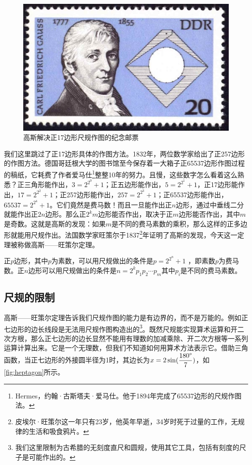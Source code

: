 \documentclass[b5paper]{ctexart}
\begin{document}
\begin{figure}[htbp]
 \centering
 \includegraphics[scale=0.5]{img/gauss-17gon}
 \caption{高斯解决正17边形尺规作图的纪念邮票}
 \label{fig:gauss-17gon}
\end{figure}

\label{sec:geometric-cons-polygon}
我们这里跳过了正17边形具体的作图方法。1832年，两位数学家给出了正257边形的作图方法。德国哥廷根大学的图书馆至今保存着一大箱子正65537边形作图过程的稿纸，它耗费了作者爱马仕\footnote{Hermes，约翰·古斯塔夫·爱马仕。他于1894年完成了65537边形的尺规作图法。}整整10年的努力。且慢，这些数字怎么看着这么熟悉？正三角形能作出，$3 = 2^{2^0} + 1$；正五边形能作出，$5 = 2^{2^1} + 1$，正17边形能作出，$17 = 2^{2^2} + 1$；正257边形能作出，$257 = 2^{2^3} + 1$；正65537边形能作出，$65537 = 2^{2^4} + 1$。它们竟然是费马数！而且一旦能作出正$n$边形，通过中垂线二分就能作出正$2n$边形。那么正$2^k m$边形能否作出，取决于正$m$边形能否作出，其中$m$是奇数。这就是高斯的发现：如果$m$是不同的费马素数的乘积，那么这样的正多边形就能用尺规作出。法国数学家旺策尔于1837\footnote{皮埃尔·旺策尔这一年只有23岁，他英年早逝，34岁时死于过量的工作，无规律的生活和吸食鸦片。}年证明了高斯的发现，今天这一定理被称做高斯——旺策尔定理。

\begin{theorem}[高斯——旺策尔]
正$p$边形，其中$p$为素数，可以用尺规做出的条件是$p=2^{2^n} + 1$ ，即素数$p$为费马数。正$n$边形可以用尺规做出的条件是$n=2^k p_1 p_2 \dotsm p_m$其中$p_i$是不同的费马素数\cite{Edward-1977}。
\end{theorem}

\subsection{尺规的限制}
高斯——旺策尔定理告诉我们尺规作图的能力是有边界的，而不是万能的。例如正七边形的边长线段是无法用尺规作图构造出的\footnote{我们这里限制为古希腊的无刻度直尺和圆规，使用其它工具，包括有刻度的尺子是可能作出的。}。既然尺规能实现算术运算和开二次方根，那么正七边形的边长显然不能用有理数的加减乘除、开二次方根等一系列运算计算出来。它是一个无理数，但我们不知道如何用算术方法表示它。借助三角函数，当正七边形的外接圆半径为1时，其边长为$x = 2\sin(\dfrac{180\degree}{7})$，如\cref{fig:heptagon}所示。
\end{document}
